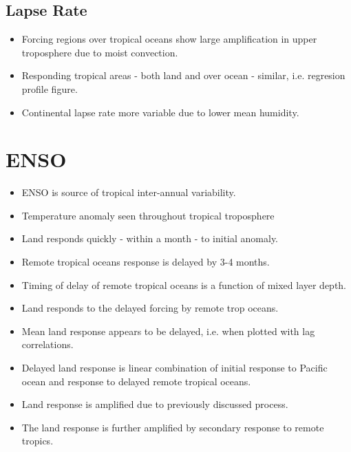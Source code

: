 \subsection{Lapse Rate}
\begin{itemize}
	\item Forcing regions over tropical oceans show large amplification in upper 
		troposphere due to moist convection.
	\item Responding tropical areas - both land and over ocean - similar, i.e.  
		regresion profile figure.
	\item Continental lapse rate more variable due to lower mean humidity.
\end{itemize}


\section{ENSO}
\begin{itemize}
	\item ENSO is source of tropical inter-annual variability.
	\item Temperature anomaly seen throughout tropical troposphere
	\item Land responds quickly - within a month - to initial anomaly.
	\item Remote tropical oceans response is delayed by 3-4 months.
	\item Timing of delay of remote tropical oceans is a function of mixed layer 
		depth.
	\item Land responds to the delayed forcing by remote trop oceans.
	\item Mean land response appears to be delayed, i.e. when plotted with lag 
		correlations.
	\item Delayed land response is linear combination of initial response to 
		Pacific ocean and response to delayed remote tropical oceans.
	\item Land response is amplified due to previously discussed process.
	\item The land response is further amplified by secondary response to remote 
		tropics.
\end{itemize}



